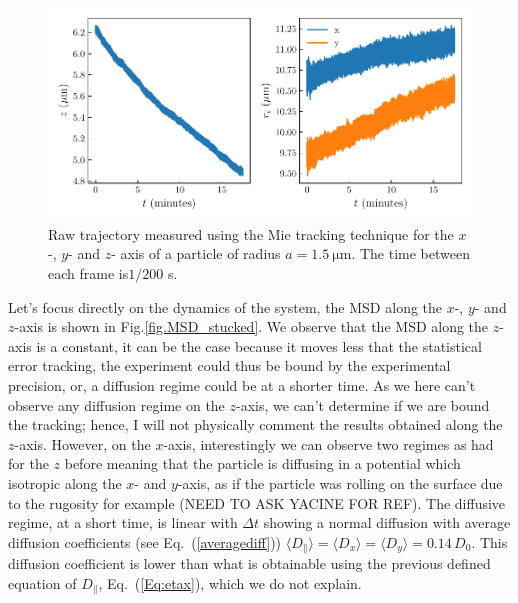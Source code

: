 \begin{figure}[H]
	\centering
	\includegraphics{02_body/chapter4/images/stucked_particle/trajectory_stucked.pdf}
	\caption{Raw trajectory measured using the Mie tracking technique for the $x$-, $y$- and $z$- axis of a particle of radius $a=1.5 ~\mathrm{\mu m}$. The time between each frame is$1/200$ s. }
	\label{fig.trajectory_stuck}
\end{figure}



Let's focus directly on the dynamics of the system, the \gls{MSD} along the $x$-, $y$- and $z$-axis is shown in Fig.\ref{fig.MSD_stucked}. We observe that the \gls{MSD} along the $z$- axis is a constant, it can be the case because it moves less that the statistical error tracking, the experiment could thus be bound by the experimental precision, or, a diffusion regime could be at a shorter time. As we here can't observe any diffusion regime on the $z$-axis, we can't determine if we are bound the tracking; hence, I will not physically comment the results obtained along the $z$-axis. However, on the $x$-axis, interestingly we can observe two regimes as had for the $z$ before meaning that the particle is diffusing in a potential which isotropic along the $x$- and $y$-axis, as if the particle was rolling on the surface due to the rugosity for example (NEED TO ASK YACINE FOR REF). The diffusive regime, at a short time, is linear with $\Delta t$ showing a normal diffusion with  average diffusion coefficients (see Eq.~(\ref{averagediff}))  $\langle{D_\parallel}\rangle= \langle D_x\rangle=\langle D_y \rangle =0.14\,D_0$. This diffusion coefficient is lower than what is obtainable using the previous defined equation of $D_\parallel$, Eq.~(\ref{Eq:etax}), which we do not explain.



